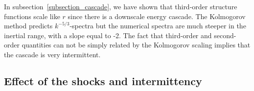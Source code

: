 


In subsection~\ref{subsection_cascade}, we have shown that third-order
structure functions scale like $r$ since there is a downscale energy
cascade.
%
The Kolmogorov method predicts $k^{-5/3}$-spectra but the numerical
spectra are much steeper in the inertial range, with a slope equal to
-2.  The fact that third-order and second-order quantities can not be
simply related by the Kolmogorov scaling implies that the cascade is
very intermittent.




\subsection{Effect of the shocks and intermittency}




